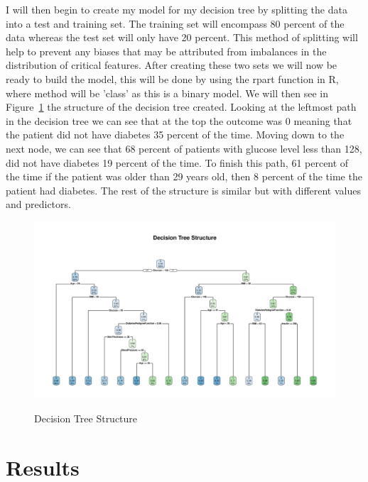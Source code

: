 \documentclass[12pt]{article}
\begin{document}
    I will then begin to create my model for my decision tree by splitting the data into a test and training set. The training set will
    encompass 80 percent of the data whereas the test set will only have 20 percent. This method of splitting will help to prevent any biases that may 
    be attributed from imbalances in the distribution of critical features. After creating these two sets we will now be ready
    to build the model, this will be done by using the rpart function in R, where method will be 'class' as this is a binary model. We will
    then see in Figure~\ref{fig:structure} the structure of the decision tree created. Looking at the leftmost path in the decision tree we 
    can see that at the top the outcome was 0 meaning that the patient did not have diabetes 35 percent of the time. Moving down to the next node, 
    we can see that 68 percent of patients with glucose level less than 128, did not have diabetes 19 percent of the time. To finish this path,
    61 percent of the time if the patient was older than 29 years old, then 8 percent of the time the patient had diabetes. The rest of the structure
    is similar but with different values and predictors.

\begin{figure}[tbp]
  \centering
  \caption{Decision Tree Structure}
  \includegraphics[width=\textwidth]{Decision Tree Structure.pdf}
  \label{fig:structure}
  \end{figure}

\section{Results}
\label{sec:resu}
\end{document}
